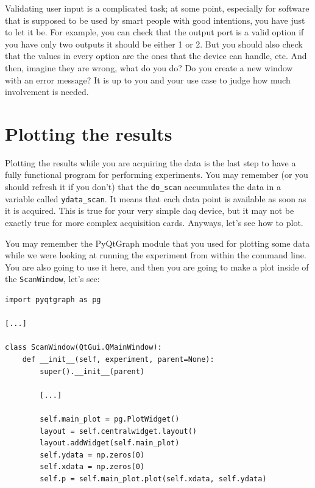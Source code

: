 Validating user input is a complicated task; at some point, especially
for software that is supposed to be used by smart people with good
intentions, you have just to let it be. For example, you can check that
the output port is a valid option if you have only two outputs it should
be either 1 or 2. But you should also check that the values in every
option are the ones that the device can handle, etc. And then, imagine
they are wrong, what do you do? Do you create a new window with an error
message? It is up to you and your use case to judge how much involvement
is needed.


\section{Plotting the results}\label{plotting-theresults}
Plotting the results while you are acquiring the data is the last step
to have a fully functional program for performing experiments. You may
remember (or you should refresh it if you don't) that the
\texttt{do_scan} accumulates the data in a variable called
\texttt{ydata_scan}. It means that each data point is available as soon
as it is acquired. This is true for your very simple daq device, but it
may not be exactly true for more complex acquisition cards. Anyways,
let's see how to plot.

You may remember the PyQtGraph module that you used for plotting some
data while we were looking at running the experiment from within the
command line. You are also going to use it here, and then you are going
to make a plot inside of the \texttt{ScanWindow}, let's see:

\begin{verbatim}
import pyqtgraph as pg

[...]

class ScanWindow(QtGui.QMainWindow):
    def __init__(self, experiment, parent=None):
        super().__init__(parent)

        [...]

        self.main_plot = pg.PlotWidget()
        layout = self.centralwidget.layout()
        layout.addWidget(self.main_plot)
        self.ydata = np.zeros(0)
        self.xdata = np.zeros(0)
        self.p = self.main_plot.plot(self.xdata, self.ydata)
\end{verbatim}

